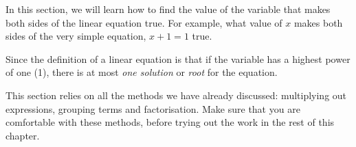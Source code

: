       
      \label{m39241*id145267}In this section, we will learn how to find the value of the variable that makes
both sides of the linear equation true. For example, what value of \begin{math}x\end{math} makes
both sides of the very simple equation, \begin{math}x+1=1\end{math} true.\par 
      \label{m39241*id145297}Since the definition of a linear equation is that if the variable has a highest power of one (1), there is
at most \textsl{one solution} or \textsl{root} for the equation.\par 
      \label{m39241*id145312}This section relies on all the methods we have already discussed: multiplying
out expressions, grouping terms and factorisation. Make sure that you are
comfortable with these methods, before trying out the work in the rest of this
chapter.\par 
      \label{m39241*id145317}\nopagebreak\noindent{}
    
